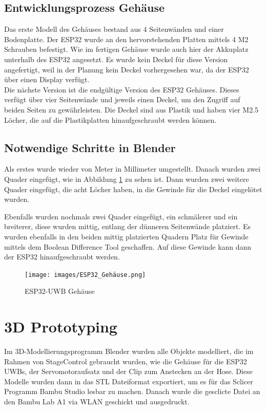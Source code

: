 \newpage
\subsection{Entwicklungsprozess Gehäuse}
Das erste Modell des Gehäuses bestand aus 4 Seitenwänden und einer Bodenplatte. Der ESP32 wurde an den hervorstehenden Platten mittels 4 M2 Schrauben befestigt. Wie im fertigen Gehäuse wurde auch hier der Akkuplatz unterhalb des ESP32 angesetzt. Es wurde kein Deckel für diese Version angefertigt, weil in der Planung kein Deckel vorhergesehen war, da der ESP32 über einen Display verfügt. \\
Die nächste Version ist die endgültige Version des ESP32 Gehäuses. Dieses verfügt über vier Seitenwände und jeweils einen Deckel, um den Zugriff auf beiden Seiten zu gewährleisten. Die Deckel sind aus Plastik und haben vier M2.5 Löcher, die auf die Plastikplatten hinaufgeschraubt werden können.

\subsection{Notwendige Schritte in Blender}
Als erstes wurde wieder von Meter in Millimeter umgestellt. Danach wurden zwei Quader eingefügt, wie in Abbildung \ref{Gehäuse} zu sehen ist. Dann wurden zwei weitere Quader eingefügt, die acht Löcher haben, in die Gewinde für die Deckel eingelötet wurden.

Ebenfalls wurden nochmals zwei Quader eingefügt, ein schmälerer und ein breiterer, diese wurden mittig, entlang der dünneren Seitenwände platziert. Es wurden ebenfalls in den beiden mittig platzierten Quadern Platz für Gewinde mittels dem Boolean Difference Tool geschaffen. Auf diese Gewinde kann dann der ESP32 hinaufgeschraubt werden.


\begin{figure}[H]
	\centering
	\texttt{[image: images/ESP32\_Gehäuse.png]}
	\caption[ESP32-UWB Gehäuse]{ESP32-UWB Gehäuse}
	\label{fig:ESP32-UWB Gehäuse}
	\label{Gehäuse}
\end{figure}

\newpage
\section{3D Prototyping}
Im 3D-Modellierungsprogramm Blender wurden alle Objekte modelliert, die im Rahmen von StageControl gebraucht wurden, wie die Gehäuse für die ESP32 UWBs, der Servomotoraufsatz und der Clip zum Anstecken an der Hose. Diese Modelle wurden dann in das STL Dateiformat exportiert, um es für das Sclicer Programm Bambu Studio lesbar zu machen. Danach wurde die gesclicte Datei an den Bambu Lab A1 via WLAN geschickt und ausgedruckt.

